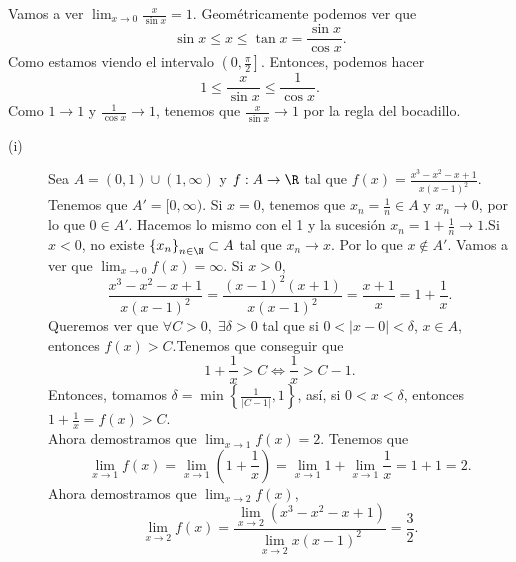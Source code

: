 \begin{eg}
\normalfont Vamos a ver $\displaystyle \lim_{x \to 0}\frac{x}{\sin x}=1 $. Geométricamente podemos ver que 
\[\sin x \leq x \leq \tan x = \frac{\sin x}{\cos x} .\]
Como estamos viendo el intervalo $\displaystyle \left(0, \frac{\pi }{2}\right] $. Entonces, podemos hacer
\[1 \leq \frac{x}{\sin x} \leq \frac{1}{\cos x} .\]
Como $\displaystyle 1\to1 $ y $\displaystyle \frac{1}{\cos x} \to 1 $, tenemos que $\displaystyle \frac{x}{\sin x} \to 1 $ por la regla del bocadillo.
\end{eg}

\begin{eg}
\normalfont 
\begin{description}
	\item[(i)] Sea $\displaystyle A = \left(0,1\right) \cup \left(1, \infty\right) $ y $\displaystyle f : A \to \R $ tal que $\displaystyle f\left(x\right) = \frac{x^{3}-x^{2}-x+1}{x\left(x-1\right)^{2}} $. Tenemos que $\displaystyle A' = [0, \infty) $. Si $\displaystyle x = 0 $, tenemos que $\displaystyle x_{n} = \frac{1}{n} \in A $ y $\displaystyle x_{n} \to 0 $, por lo que $\displaystyle 0 \in A' $. Hacemos lo mismo con el 1 y la sucesión $\displaystyle x_{n} = 1 +\frac{1}{n} \to 1 $.Si $\displaystyle x < 0 $, no existe $\displaystyle \left\{ x_{n}\right\} _{n\in\N}\subset A $ tal que $\displaystyle x_{n} \to x $. Por lo que $\displaystyle x \not\in A' $. Vamos a ver que $\displaystyle \lim_{x \to 0}f\left(x\right)= \infty $. Si $\displaystyle x > 0 $, 
\[\frac{x^{3}-x^{2}-x+1}{x\left(x-1\right)^{2}} = \frac{\left(x-1\right)^{2}\left(x+1\right)}{x\left(x-1\right)^{2}} = \frac{x+1}{x} = 1 + \frac{1}{x} .\]
Queremos ver que $\displaystyle \forall C>0, \; \exists\delta>0 $ tal que si $\displaystyle 0 < \left|x-0\right| < \delta  $, $\displaystyle x \in A $, entonces $\displaystyle f\left(x\right) > C $.Tenemos que conseguir que 
\[1 + \frac{1}{x} > C \iff \frac{1}{x} > C - 1 .\]
Entonces, tomamos $\displaystyle \delta = \min \left\{ \frac{1}{ \left|C-1\right|}, 1\right\}  $, así, si $\displaystyle 0 < x < \delta  $, entonces $\displaystyle 1 + \frac{1}{x} = f\left(x\right) > C $. \\
Ahora demostramos que $\displaystyle \lim_{x \to 1}f\left(x\right) = 2 $. Tenemos que 
\[\lim_{x \to 1}f\left(x\right) = \lim_{x \to 1}\left(1+\frac{1}{x}\right) = \lim_{x \to 1}1 + \lim_{x \to 1}\frac{1}{x} = 1 + 1 = 2 .\]
Ahora demostramos que $\displaystyle \lim_{x \to 2}f\left(x\right) $,
\[\lim_{x \to 2}f\left(x\right) = \frac{\lim_{x \to 2}\left(x^{3}-x^{2}-x+1\right)}{\lim_{x \to 2}x\left(x-1\right)^{2}} = \frac{3}{2} .\]

\end{description}
\end{eg}
